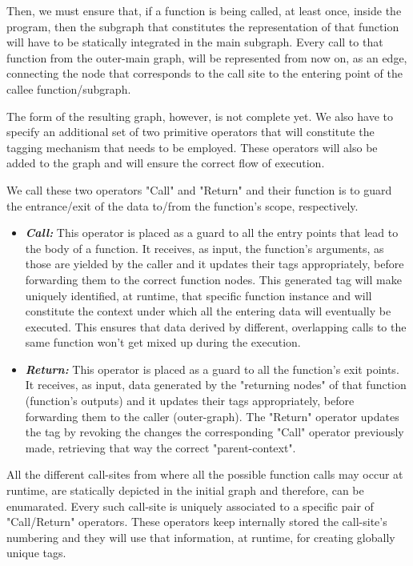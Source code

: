\documentclass[ack,preface]{dithesis}
\begin{document}
Then, we must ensure that, if a function is being called, at least once, inside the program, then the subgraph that constitutes the representation of that function will have to be statically integrated in the main subgraph. Every call to that function from the outer-main graph, will be represented from now on, as an edge, connecting the node that corresponds to the call site to the entering point of the callee function/subgraph.

The form of the resulting graph, however, is not complete yet. We also have to specify an additional set of two primitive operators that will constitute the tagging mechanism that needs to be employed. These operators will also be added to the graph and will ensure the correct flow of execution.

We call these two operators "Call" and "Return" and their function is to guard the entrance/exit of the data to/from the function's scope, respectively.

    \begin{itemize}

    \item \textit{\textbf{Call:}} This operator is placed as a guard to all the entry points that lead to the body of a function. It receives, as input, the function's arguments, as those are yielded by the caller and it updates their tags appropriately, before forwarding them to the correct function nodes. This generated tag will make uniquely identified, at runtime, that specific function instance and will constitute the context under which all the entering data will eventually be executed. This ensures that data derived by different, overlapping calls to the same function won't get mixed up during the execution.

    \item \textit{\textbf{Return:}} This operator is placed as a guard to all the function's exit points. It receives, as input, data generated by the "returning nodes" of that function (function's outputs) and it updates their tags appropriately, before forwarding them to the caller (outer-graph).  The "Return" operator updates the tag by revoking the changes the corresponding "Call" operator previously made, retrieving that way the correct "parent-context".

    \end{itemize}

All the different call-sites from where all the possible function calls may occur at runtime, are statically depicted in the initial graph and therefore, can be enumarated.
Every such call-site is uniquely associated to a specific pair of "Call/Return" operators. These operators keep internally stored the call-site's numbering and they will use that information, at runtime, for creating globally unique tags. 
\end{document}
